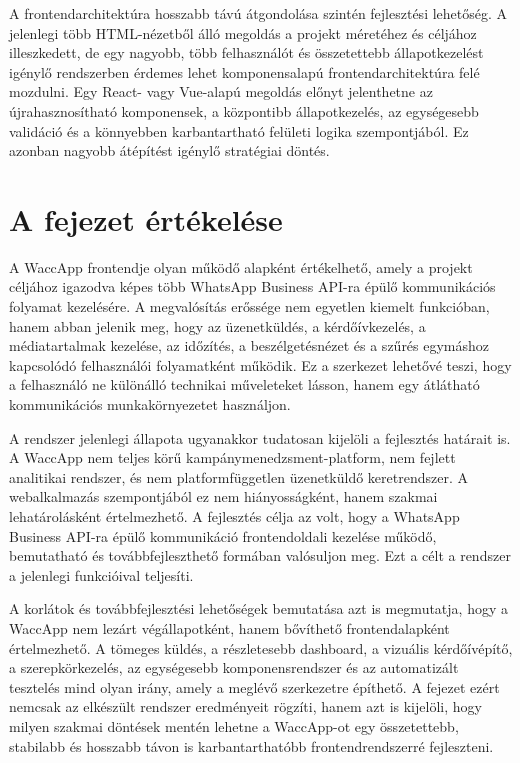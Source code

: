 A frontendarchitektúra hosszabb távú átgondolása szintén fejlesztési lehetőség. A jelenlegi több HTML-nézetből álló megoldás a projekt méretéhez és céljához illeszkedett, de egy nagyobb, több felhasználót és összetettebb állapotkezelést igénylő rendszerben érdemes lehet komponensalapú frontendarchitektúra felé mozdulni. Egy React- vagy Vue-alapú megoldás előnyt jelenthetne az újrahasznosítható komponensek, a központibb állapotkezelés, az egységesebb validáció és a könnyebben karbantartható felületi logika szempontjából. Ez azonban nagyobb átépítést igénylő stratégiai döntés.

\section{A fejezet értékelése}

A WaccApp frontendje olyan működő alapként értékelhető, amely a projekt céljához igazodva képes több WhatsApp Business API-ra épülő kommunikációs folyamat kezelésére. A megvalósítás erőssége nem egyetlen kiemelt funkcióban, hanem abban jelenik meg, hogy az üzenetküldés, a kérdőívkezelés, a médiatartalmak kezelése, az időzítés, a beszélgetésnézet és a szűrés egymáshoz kapcsolódó felhasználói folyamatként működik. Ez a szerkezet lehetővé teszi, hogy a felhasználó ne különálló technikai műveleteket lásson, hanem egy átlátható kommunikációs munkakörnyezetet használjon.

A rendszer jelenlegi állapota ugyanakkor tudatosan kijelöli a fejlesztés határait is. A WaccApp nem teljes körű kampánymenedzsment-platform, nem fejlett analitikai rendszer, és nem platformfüggetlen üzenetküldő keretrendszer. A webalkalmazás szempontjából ez nem hiányosságként, hanem szakmai lehatárolásként értelmezhető. A fejlesztés célja az volt, hogy a WhatsApp Business API-ra épülő kommunikáció frontendoldali kezelése működő, bemutatható és továbbfejleszthető formában valósuljon meg. Ezt a célt a rendszer a jelenlegi funkcióival teljesíti.

A korlátok és továbbfejlesztési lehetőségek bemutatása azt is megmutatja, hogy a WaccApp nem lezárt végállapotként, hanem bővíthető frontendalapként értelmezhető. A tömeges küldés, a részletesebb dashboard, a vizuális kérdőívépítő, a szerepkörkezelés, az egységesebb komponensrendszer és az automatizált tesztelés mind olyan irány, amely a meglévő szerkezetre építhető. A fejezet ezért nemcsak az elkészült rendszer eredményeit rögzíti, hanem azt is kijelöli, hogy milyen szakmai döntések mentén lehetne a WaccApp-ot egy összetettebb, stabilabb és hosszabb távon is karbantarthatóbb frontendrendszerré fejleszteni.
